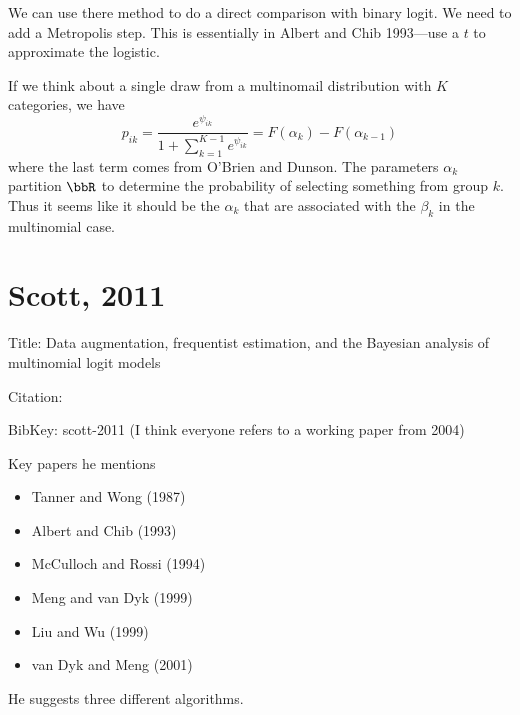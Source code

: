\documentclass{article}
\begin{document}
We can use there method to do a direct comparison with binary logit.  We need to
add a Metropolis step.  This is essentially in Albert and Chib 1993---use a $t$
to approximate the logistic.

If we think about a single draw from a multinomail distribution with $K$
categories, we have
\[
p_{ik} = \frac{e^{\psi_{ik}}}{1 + \sum_{k=1}^{K-1} e^{\psi_{ik}}} = F(\alpha_k)
- F(\alpha_{k-1})
\]
where the last term comes from O'Brien and Dunson.  The parameters $\alpha_k$
partition $\bbR$ to determine the probability of selecting something from group
$k$.  Thus it seems like it should be the $\alpha_k$ that are associated with
the $\beta_k$ in the multinomial case.

\section{Scott, 2011}

Title: Data augmentation, frequentist estimation, and the Bayesian analysis of
multinomial logit models

Citation: \cite{scott-2011}

BibKey: scott-2011 (I think everyone refers to a working paper from 2004)

Key papers he mentions
\begin{itemize}
\item Tanner and Wong (1987)
\item Albert and Chib (1993)
\item McCulloch and Rossi (1994)
\item Meng and van Dyk (1999)
\item Liu and Wu (1999)
\item van Dyk and Meng (2001)
\end{itemize}

He suggests three different algorithms.
\end{document}
